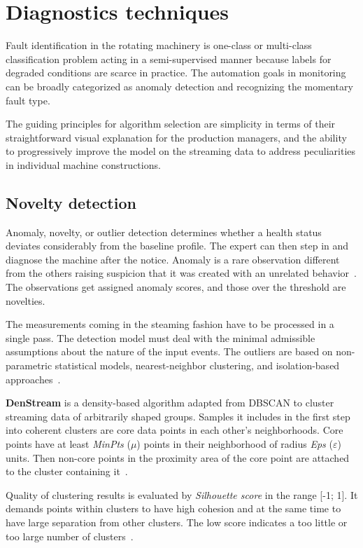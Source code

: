 \section{Diagnostics techniques} \label{section:diagnostics-techniques}
Fault identification in the rotating machinery is one-class or multi-class classification problem acting in a semi-supervised manner because labels for degraded conditions are scarce in practice. The automation goals in monitoring can be broadly categorized as anomaly detection and recognizing the momentary fault type.

The guiding principles for algorithm selection are simplicity in terms of their straightforward visual explanation for the production managers, and the ability to progressively improve the model on the streaming data to address peculiarities in individual machine constructions.

\subsection{Novelty detection}
Anomaly, novelty, or outlier detection determines whether a health status deviates considerably from the baseline profile. The expert can then step in and diagnose the machine after the notice. Anomaly is a rare observation different from the others raising suspicion that it was created with an unrelated behavior~\cite{aggarwal_outlier_2016}. The observations get assigned anomaly scores, and those over the threshold are novelties.

The measurements coming in the steaming fashion have to be processed in a single pass. The detection model must deal with the minimal admissible assumptions about the nature of the input events. The outliers are based on non-parametric statistical models, nearest-neighbor clustering, and isolation-based approaches~\cite{gervasi_anomaly_2020}.
\bigbreak

\textbf{DenStream} is a density-based algorithm adapted from DBSCAN to cluster streaming data of arbitrarily shaped groups. Samples it includes in the first step into coherent clusters are core data points in each other's neighborhoods. Core points have at least \emph{MinPts} ($\mu$) points in their neighborhood of radius \emph{Eps} ($\varepsilon$) units. Then non-core points in the proximity area of the core point are attached to the cluster containing it~\cite{aggarwal_data_2014}.

Quality of clustering results is evaluated by \emph{Silhouette score} in the range [-1; 1]. It demands points within clusters to have high cohesion and at the same time to have large separation from other clusters. The low score indicates a too little or too large number of clusters~\cite{rousseeuw_rousseeuw_1987}. 

